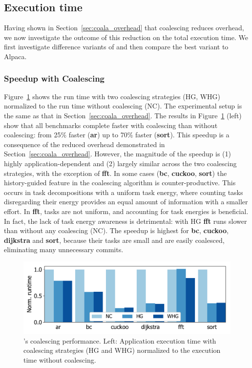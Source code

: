 \subsection{Execution time}
\label{sec:result_coalescing}

Having shown in Section~\ref{sec:coala_overhead} that coalescing reduces
overhead, we now investigate the outcome of this reduction on the total
execution time. We first investigate difference variants of \sys and
then compare the best variant to Alpaca.


\subsubsection{\sys Speedup with Coalescing}

Figure~\ref{fig:coalescing} shows the \sys run time with two coalescing
strategies (HG, WHG) normalized to the run time without coalescing (NC).
%
The experimental setup is the same as that in Section~\ref{sec:coala_overhead}.
%
The results in Figure~\ref{fig:coalescing} (left) show that all benchmarks
complete faster with coalescing than without coalescing: from 25\% faster
(\textbf{ar}) up to 70\% faster (\textbf{sort}).
%
This speedup is a consequence of the reduced overhead demonstrated in
Section~\ref{sec:coala_overhead}.
%
However, the magnitude of the speedup is (1) highly application-dependent and
(2) largely similar across the two coalescing strategies, with the exception of
\textbf{fft}.
%
In some cases (\textbf{bc}, \textbf{cuckoo}, \textbf{sort}) the history-guided
feature in the coalescing algorithm is counter-productive.
%
This occurs in task decompositions with a uniform task energy, where counting
tasks disregarding their energy provides an equal amount of information with a
smaller effort.
%
In \textbf{fft}, tasks are not uniform, and accounting for task energies is
beneficial. In fact, the lack of task energy awareness is detrimental: with HG
\textbf{fft} runs slower than without any coalescing (NC).
%
The speedup is highest for \textbf{bc}, \textbf{cuckoo}, \textbf{dijkstra} and
\textbf{sort}, because their tasks are small and are easily coalesced,
eliminating many unnecessary commits.

\begin{figure}
	\includegraphics[width=\columnwidth]{figures/coalStrategies}%
    \caption{\sys's coalescing performance. Left: Application execution time
with coalescing strategies (HG and WHG) normalized to the execution time
without coalescing.}
	\label{fig:coalescing}
\end{figure}

